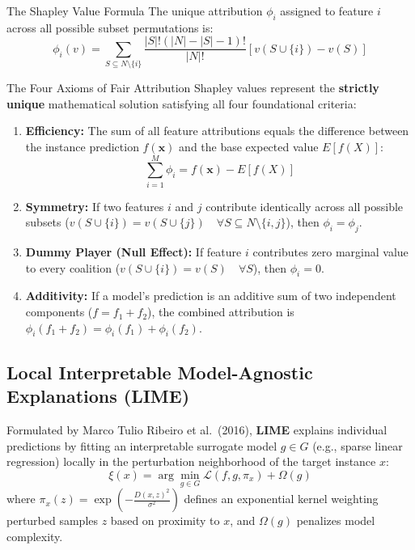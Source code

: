 \begin{definitionbox}{The Shapley Value Formula}
The unique attribution $\phi_i$ assigned to feature $i$ across all possible subset permutations is:
\begin{equation}
\phi_i(v) = \sum_{S \subseteq N \setminus \{i\}} \frac{|S|!(|N| - |S| - 1)!}{|N|!} \left[ v(S \cup \{i\}) - v(S) \right]
\label{eq:shapley_full}
\end{equation}
\end{definitionbox}

\begin{theorembox}{The Four Axioms of Fair Attribution}
Shapley values represent the \textbf{strictly unique} mathematical solution satisfying all four foundational criteria:
\begin{enumerate}
    \item \textbf{Efficiency:} The sum of all feature attributions equals the difference between the instance prediction $f(\mathbf{x})$ and the base expected value $E[f(X)]$:
    \begin{equation}
    \sum_{i=1}^M \phi_i = f(\mathbf{x}) - E[f(X)]
    \label{eq:axiom_efficiency}
    \end{equation}
    \item \textbf{Symmetry:} If two features $i$ and $j$ contribute identically across all possible subsets ($v(S \cup \{i\}) = v(S \cup \{j\}) \quad \forall S \subseteq N \setminus \{i, j\}$), then $\phi_i = \phi_j$.
    \item \textbf{Dummy Player (Null Effect):} If feature $i$ contributes zero marginal value to every coalition ($v(S \cup \{i\}) = v(S) \quad \forall S$), then $\phi_i = 0$.
    \item \textbf{Additivity:} If a model's prediction is an additive sum of two independent components ($f = f_1 + f_2$), the combined attribution is $\phi_i(f_1 + f_2) = \phi_i(f_1) + \phi_i(f_2)$.
\end{enumerate}
\end{theorembox}

\subsection{Local Interpretable Model-Agnostic Explanations (LIME)}
Formulated by Marco Tulio Ribeiro et al.~(2016), \textbf{LIME} explains individual predictions by fitting an interpretable surrogate model $g \in G$ (e.g., sparse linear regression) locally in the perturbation neighborhood of the target instance $x$:
\begin{equation}
\xi(x) = \arg\min_{g \in G} \mathcal{L}(f, g, \pi_x) + \Omega(g)
\label{eq:lime_loss}
\end{equation}
where $\pi_x(z) = \exp\left(-\frac{D(x, z)^2}{\sigma^2}\right)$ defines an exponential kernel weighting perturbed samples $z$ based on proximity to $x$, and $\Omega(g)$ penalizes model complexity.

